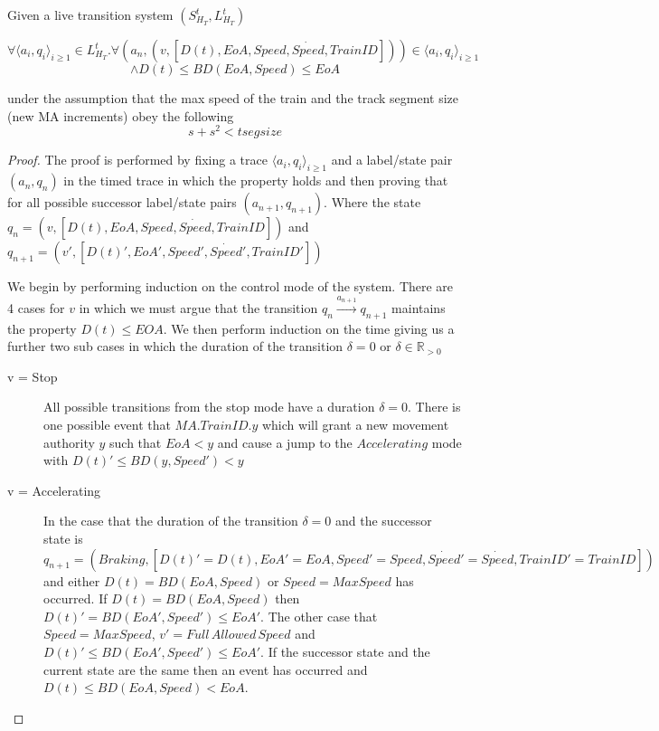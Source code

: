 \begin{mytheorem}
Given a live transition system $(S^t_{H_{T}},  L^{t}_{H_T}) $

 $$\forall \langle a_i, q_i \rangle_{i \geq 1} \in L^{t}_{H_T}.  \forall (a_n, (v, [D(t), EoA,Speed,\dot{Speed},TrainID])) \in \langle a_i, q_i \rangle_{i \geq 1}$$ $$ \wedge  D(t) \leq BD(EoA,Speed)  \leq EoA$$ 

under the assumption that the max speed of the train and the track segment size (new MA increments) obey the following
                     $$s + s^2 < tsegsize$$
\begin{proof}


The proof is performed by fixing a trace $ \langle a_i, q_i \rangle_{i \geq 1}$ and  a label/state pair $(a_n, q_n)$ in the timed trace in which the property holds and then proving that for all possible successor label/state pairs $(a_{n+1},q_{n+1})$. Where  the state $q_n = (v, [D(t), EoA,Speed,\dot{Speed},TrainID])$ and $q_{n+1} = (v', [D(t)', EoA',Speed',\dot{Speed}',TrainID'])$ 

We begin by performing induction on the control mode of the system. 
There are 4 cases for $v$ in which we must argue that the transition $q_n \xrightarrow{a_{n+1}} q_{n+1}$  maintains the property $D(t) \leq EOA$. We then perform induction on the time giving us a further two sub
cases in which the duration of the transition  $\delta = 0$ or $\delta \in \mathbb{R}_{>0}$



\begin{description}
\item[v = Stop] All possible transitions from the stop mode have a duration $\delta = 0$. There is one possible event that $MA.TrainID.y$ which will grant a new movement authority $y$ such that $EoA < y$ and cause a jump to the $Accelerating$ mode with $D(t)' \leq BD(y,Speed') < y$


\item[v = Accelerating] In the case that the duration of the transition $\delta = 0$ and the successor state is $q_{n+1} = (Braking,[D(t)' = D(t), EoA' = EoA,Speed' = Speed ,\dot{Speed}' = \dot{Speed},TrainID' = TrainID])$ and either $D(t) = BD(EoA,Speed)$ or $Speed = MaxSpeed$ has occurred. If $D(t) = BD(EoA,Speed)$ then $D(t)' = BD(EoA', Speed') \leq EoA'$. The other case that $Speed = MaxSpeed$, $v' = Full \,  Allowed \, Speed$ and $D(t)' \leq BD(EoA', Speed') \leq EoA'$. If the successor state and the current state are the same then an event has occurred and $D(t) \leq BD(EoA,Speed) < EoA$.
  

\end{description}
\end{proof}
\end{mytheorem}
